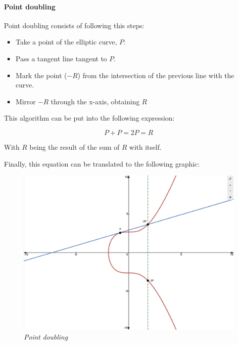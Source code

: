 \documentclass{article}
\newcommand\tab[1][1cm]{\hspace*{#1}}
\begin{document}
\vspace{5mm} %

\paragraph{Point doubling}

\tab Point doubling consists of following this steps:

\begin{itemize}
    \item Take a point of the elliptic curve, \(P\).
    \item Pass a tangent line tangent to \(P\).
    \item Mark the point (\(-R\)) from the intersection of the previous line with the curve.
    \item Mirror \(-R\) through the x-axis, obtaining \(R\)
\end{itemize}

This algorithm can be put into the following expression:

\[P + P = 2P = R\]

With \(R\) being the result of the sum of \(R\) with itself.

Finally, this equation can be translated to the following graphic:

\vspace{5mm} %

\begin{figure}[H]
    \begin{center}
        \includegraphics[width=0.6 \textwidth]{images/point_doubling.png}
        \caption{\textit{Point doubling}}
    \end{center}
\end{figure}

\vspace{5mm} %
\end{document}
